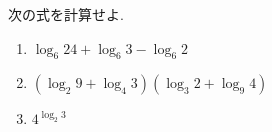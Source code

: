 \documentclass[8pt,dvipdfmx]{article}[b5paper]
\begin{document}
\begin{tcolorbox}[title=数学\textcircled{2} 2-1 A]
次の式を計算せよ.
\begin{enumerate}[(1)]
    \item \( \log_6 24 + \log_6 3 - \log_6 2 \)
    \item \( (\log_2 9 + \log_4 3)(\log_3 2 + \log_9 4) \)
\item $4^{\log_2 3}$
\end{enumerate}
\end{tcolorbox}




\end{document}
